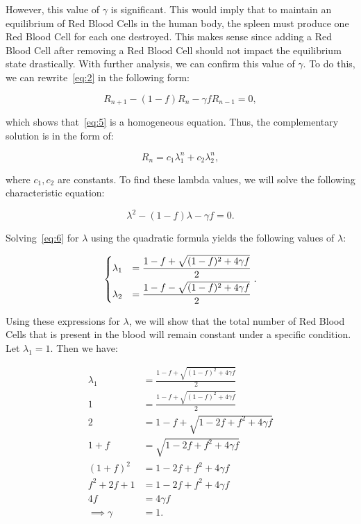 However, this value of $\gamma$ is significant. This would imply that to maintain an equilibrium of Red Blood Cells in the human body, the spleen must produce one Red Blood Cell for each one destroyed. This makes sense since adding a Red Blood Cell after removing a Red Blood Cell should not impact the equilibrium state drastically. With further analysis, we can confirm this value of $\gamma$. To do this, we can rewrite~\eqref{eq:2} in the following form:

\begin{equation}
    R_{n+1} - (1-f)R_n - \gamma fR_{n-1} = 0, \label{eq:5}
\end{equation}

which shows that~\eqref{eq:5} is a homogeneous equation. Thus, the complementary solution is in the form of:

\[
R_n = c_1\lambda_1^n + c_2\lambda_2^n,
\]

where $c_1,c_2$ are constants. To find these lambda values, we will solve the following characteristic equation:

\begin{equation} \label{eq:6}
    \lambda^2 - (1 - f)\lambda - \gamma f = 0.
\end{equation}

Solving~\eqref{eq:6} for $\lambda$ using the quadratic formula yields the following values of $\lambda$:

\[
\begin{dcases}
    \lambda_1 &= \frac{1-f + \sqrt{(1-f)^2 + 4\gamma f}}{2}\\
    \lambda_2 &= \frac{1-f - \sqrt{(1-f)^2 + 4\gamma f}}{2}
\end{dcases}.
\]

Using these expressions for $\lambda$, we will show that the total number of Red Blood Cells that is present in the blood will remain constant under a specific condition. Let $\lambda_1=1$. Then we have:

\begin{align*}
    \lambda_1 &= \frac{1-f + \sqrt{(1-f)^2 + 4\gamma f}}{2}\\
    1 &= \frac{1-f + \sqrt{(1-f)^2 + 4\gamma f}}{2}\\
    2 &= 1-f + \sqrt{1 - 2f + f^2 + 4\gamma f}\\
    1 + f &= \sqrt{1 - 2f + f^2 + 4\gamma f}\\
    (1 + f)^2 &= 1 - 2f + f^2 + 4\gamma f\\
    f^2 + 2f + 1 &= 1 - 2f + f^2 + 4\gamma f\\
    4f &= 4\gamma f\\
    \implies\gamma &= 1.
\end{align*}


